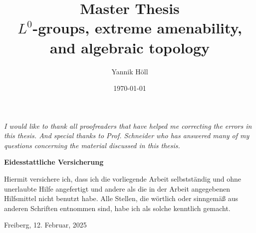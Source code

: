 \documentclass[a4paper, 12pt, twoside]{article}
\title{Master Thesis\\{$L^0$-groups, extreme amenability, and algebraic topology}}
\author{Yannik Höll}
\date{\today}
\theoremstyle{break}
\theoremstyle{break}
\begin{document}
\begin{titlingpage}
    \maketitle
\end{titlingpage}
\clearpage

\vspace*{\fill}
\begin{center}
\textit{
    I would like to thank all proofreaders that have helped me correcting the errors in this thesis. 
    And special thanks to Prof. Schneider who has answered many of my questions concerning the material discussed in this thesis.  
}
\end{center}
\vspace*{\fill}
\thispagestyle{empty}
\clearpage

\tableofcontents
\vspace*{11cm}
\pagebreak

\printnomenclature
\pagebreak

\nocite{*}


\pagebreak

\pagebreak

\pagebreak

\pagebreak

\pagebreak

\appendix
\pagebreak

\clearpage

\vspace*{\fill}
\noindent
\textbf{Eidesstattliche Versicherung}

\noindent
Hiermit versichere ich, dass ich die vorliegende Arbeit selbstständig und ohne unerlaubte Hilfe angefertigt und andere als die in der Arbeit angegebenen Hilfsmittel nicht benutzt habe. Alle Stellen, die wörtlich oder sinngemäß aus anderen Schriften entnommen sind, habe ich als solche kenntlich gemacht.
\vspace*{50px}

\noindent
Freiberg, 12. Februar, 2025  
\vspace*{\fill}

\clearpage
\printbibliography
\end{document}
